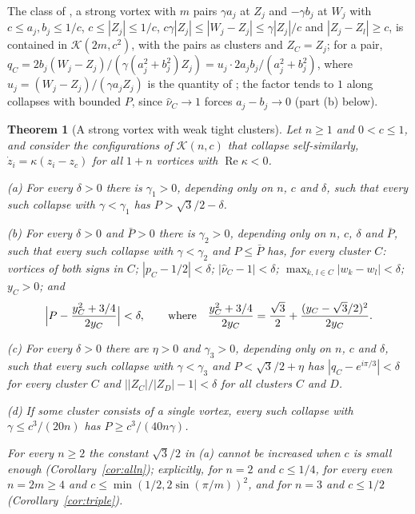 \documentclass[11pt]{article}
\newtheorem{theorem}{Theorem}
\theoremstyle{definition}
\newcommand{\re}{\operatorname{Re}}
\newcommand{\K}{\mathcal{K}}
\newcommand{\hnu}{\widehat{\nu}}
\begin{document}
The class of \cite[Theorem~3]{mw2026}, a strong vortex with $m$ pairs $\gamma a_j$ at $Z_j$ and $-\gamma b_j$ at $W_j$ with $c \le a_j, b_j \le 1/c$, $c \le |Z_j| \le 1/c$, $c\gamma|Z_j| \le |W_j - Z_j| \le \gamma|Z_j|/c$ and $|Z_j - Z_l| \ge c$, is contained in $\K(2m, c^2)$, with the pairs as clusters and $Z_C = Z_j$; for a pair, $q_C = 2b_j(W_j - Z_j)/(\gamma(a_j^2 + b_j^2)Z_j) = u_j\cdot 2a_jb_j/(a_j^2 + b_j^2)$, where $u_j = (W_j - Z_j)/(\gamma a_jZ_j)$ is the quantity of \cite{mw2026}; the factor tends to $1$ along collapses with bounded $P$, since $\hnu_C \to 1$ forces $a_j - b_j \to 0$ (part (b) below).

\begin{theorem}[A strong vortex with weak tight clusters]\label{thm:clusters}
Let $n \ge 1$ and $0 < c \le 1$, and consider the configurations of $\K(n, c)$ that collapse self-similarly, $\dot z_i = \kappa(z_i - z_c)$ for all $1 + n$ vortices with $\re\kappa < 0$.

\textup{(a)} For every $\delta > 0$ there is $\gamma_1 > 0$, depending only on $n$, $c$ and $\delta$, such that every such collapse with $\gamma < \gamma_1$ has $P > \sqrt{3}/2 - \delta$.

\textup{(b)} For every $\delta > 0$ and $\bar P > 0$ there is $\gamma_2 > 0$, depending only on $n$, $c$, $\delta$ and $\bar P$, such that every such collapse with $\gamma < \gamma_2$ and $P \le \bar P$ has, for every cluster $C$: vortices of both signs in $C$; $|p_C - 1/2| < \delta$; $|\hnu_C - 1| < \delta$; $\max_{k,\,l \in C}|w_k - w_l| < \delta$; $y_C > 0$; and
\[
  \Bigl|P - \frac{y_C^2 + 3/4}{2y_C}\Bigr| < \delta, \qquad \text{where} \quad \frac{y_C^2 + 3/4}{2y_C} = \frac{\sqrt{3}}{2} + \frac{(y_C - \sqrt{3}/2)^2}{2y_C}.
\]

\textup{(c)} For every $\delta > 0$ there are $\eta > 0$ and $\gamma_3 > 0$, depending only on $n$, $c$ and $\delta$, such that every such collapse with $\gamma < \gamma_3$ and $P < \sqrt{3}/2 + \eta$ has $|q_C - e^{i\pi/3}| < \delta$ for every cluster $C$ and $\bigl||Z_C|/|Z_D| - 1\bigr| < \delta$ for all clusters $C$ and $D$.

\textup{(d)} If some cluster consists of a single vortex, every such collapse with $\gamma \le c^3/(20n)$ has $P \ge c^3/(40n\gamma)$.

For every $n \ge 2$ the constant $\sqrt{3}/2$ in \textup{(a)} cannot be increased when $c$ is small enough (Corollary~\ref{cor:alln}); explicitly, for $n = 2$ and $c \le 1/4$, for every even $n = 2m \ge 4$ and $c \le \min(1/2, 2\sin(\pi/m))^2$, and for $n = 3$ and $c \le 1/2$ (Corollary~\ref{cor:triple}).
\end{theorem}
\end{document}
